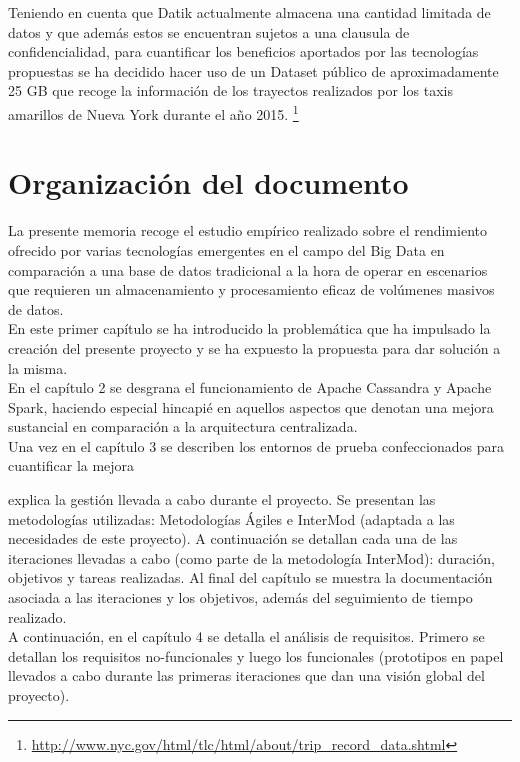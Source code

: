Teniendo en cuenta que Datik actualmente almacena una cantidad limitada de datos y que además estos se encuentran sujetos a una clausula de confidencialidad, para cuantificar los beneficios aportados por las tecnologías propuestas se ha decidido hacer uso de un Dataset público de aproximadamente 25 GB que recoge la información de los trayectos realizados por los taxis amarillos de Nueva York durante el año 2015. \footnote{\url{http://www.nyc.gov/html/tlc/html/about/trip_record_data.shtml}}

\section{Organización del documento}

La presente memoria recoge el estudio empírico realizado sobre el rendimiento ofrecido por varias tecnologías emergentes en el campo del Big Data en comparación a una base de datos tradicional a la hora de operar en escenarios que requieren un almacenamiento y procesamiento eficaz de volúmenes masivos de datos.\\

En este primer capítulo se ha introducido la problemática que ha impulsado la creación del presente proyecto y se ha expuesto la propuesta para dar solución a la misma.\\

En el capítulo 2 se desgrana el funcionamiento de Apache Cassandra y Apache Spark, haciendo especial hincapié en aquellos aspectos que denotan una mejora sustancial en comparación a la arquitectura centralizada.\\

Una vez en el capítulo 3 se describen los entornos de prueba confeccionados para cuantificar la mejora 

explica la gestión llevada a cabo durante el proyecto. Se presentan las metodologías utilizadas: Metodologías Ágiles e InterMod (adaptada a las necesidades de este proyecto). A continuación se detallan cada una de las iteraciones llevadas a cabo (como parte de la metodología InterMod): duración, objetivos y tareas realizadas. Al final del capítulo se muestra la documentación asociada a las iteraciones y los objetivos, además del seguimiento de tiempo realizado.\\

A continuación, en el capítulo 4 se detalla el análisis de requisitos. Primero se detallan los requisitos no-funcionales y luego los funcionales (prototipos en papel llevados a cabo durante las primeras iteraciones que dan una visión global del proyecto).\\

